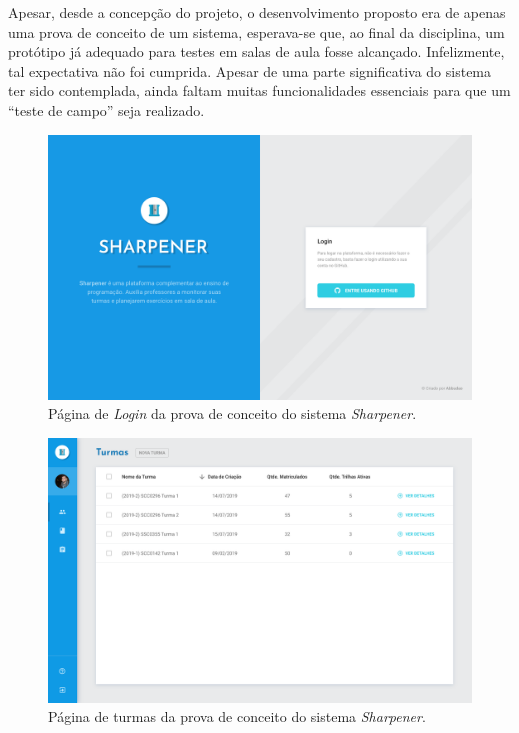 Apesar, desde a concepção do projeto, o desenvolvimento proposto era de apenas uma prova 
de conceito de um sistema, esperava-se que, ao final da disciplina, um protótipo já adequado 
para testes em salas de aula fosse alcançado. Infelizmente, tal expectativa não foi cumprida.  
Apesar de uma parte significativa do sistema ter sido contemplada, ainda faltam 
muitas funcionalidades essenciais para que um ``teste de campo'' seja realizado.

  \begin{figure}[htpb]
    \centering
    \includegraphics[width=\linewidth]{images/mocks/login.png}
    \caption{Página de \emph{Login} da prova de conceito do sistema \emph{Sharpener}.}%
    \label{fig:login}
  \end{figure}

  \begin{figure}[htpb]
    \centering
    \includegraphics[width=\linewidth]{images/mocks/turma.png}
    \caption{Página de turmas da prova de conceito do sistema \emph{Sharpener}.}%
    \label{fig:turmas}
  \end{figure}

